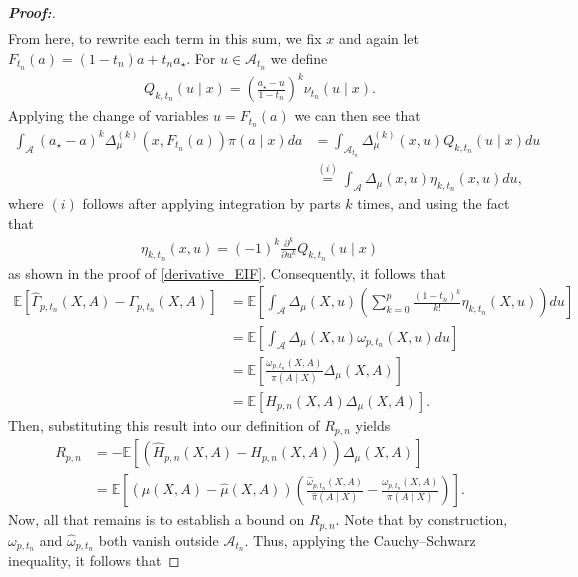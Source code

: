 \documentclass[11pt,twoside]{article}
\theoremstyle{definition}
\theoremstyle{remark}
\begin{document}
\begin{proof}[\textbf{Proof:}]
\begin{align*}
\end{align*}
From here, to rewrite each term in this sum, we fix $x$ and again let $F_{t_n}(a) = (1-t_n)a+t_na_\star$. For $u\in\mathcal{A}_{t_n}$ we define
\begin{align*}
     Q_{k,t_n}(u\mid x) = \left(\frac{a_\star-u}{1-t_n} \right)^k \nu_{t_n}(u\mid x).
\end{align*}
Applying the change of variables $u=F_{t_n}(a)$ we can then see that 
\begin{align*}
    \int_{\mathcal{A}} (a_\star-a)^k \Delta_\mu^{(k)} \!\left(x,F_{t_n}(a)\right) \pi(a\mid x) da &= \int_{\mathcal{A}_{t_n}} \Delta_\mu^{(k)}(x,u) Q_{k,t_n}(u\mid x)du \\
    &\overset{(i)}{=}  \int_{\mathcal{A}} \Delta_\mu(x,u) \eta_{k,t_n}(x,u)du,
\end{align*}
where $(i)$ follows after applying integration by parts $k$ times, and using the fact that
\begin{align*}
     \eta_{k,t_n}(x,u) = (-1)^k \frac{\partial^k}{\partial u^k} Q_{k,t_n}(u\mid x)
\end{align*}
as shown in the proof of \cref{derivative_EIF}. Consequently, it follows that
\begin{align*}
    \mathbb{E}\!\left[ \widehat\Gamma_{p,t_n}(X,A) - \Gamma_{p,t_n}(X,A)\right] &= \mathbb{E}\!\left[\int_{\mathcal{A}} \Delta_\mu(X,u) \left(\sum_{k=0}^{p} \frac{(1-t_n)^k}{k!} \eta_{k,t_n}(X,u) \right) du \right] \\
    &=  \mathbb{E}\!\left[ \int_{\mathcal{A}} \Delta_\mu(X,u) \omega_{p,t_n}(X,u) du \right] \\
    &=  \mathbb{E}\!\left[\frac{\omega_{p,t_n}(X,A)}{\pi(A\mid X)} \Delta_\mu(X,A) \right] \\
    &= \mathbb{E}\!\left[ H_{p,n}(X,A) \Delta_\mu(X,A) \right].
\end{align*}
Then, substituting this result into our definition of $R_{p, n}$ yields
\begin{align*}
    R_{p,n} &= - \mathbb{E}\!\left[\left(\widehat H_{p,n}(X,A)-H_{p,n}(X,A)\right) \Delta_\mu(X,A) \right] \\
    &= \mathbb{E}\!\left[(\mu(X,A)-\widehat\mu(X,A))\left(\frac{\widehat\omega_{p,t_n}(X,A)}{\widehat\pi(A\mid X)} - \frac{\omega_{p,t_n}(X,A)}{\pi(A\mid X)} \right)\right].
\end{align*}
Now, all that remains is to establish a bound on $R_{p,n}$. Note that by construction, $\omega_{p,t_n}$ and $\widehat\omega_{p,t_n}$ both vanish outside
$\mathcal{A}_{t_n}$. Thus, applying the Cauchy--Schwarz inequality, it follows that

\end{proof}
\end{document}
